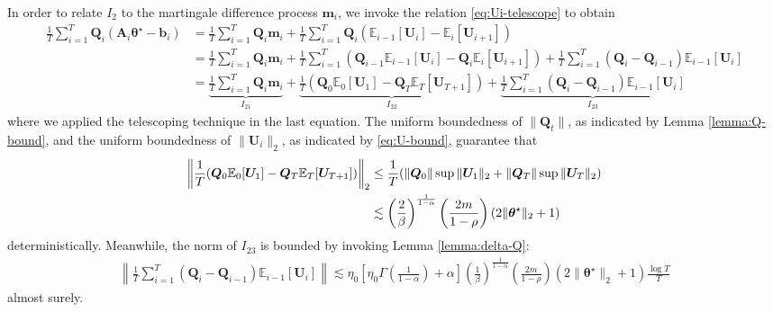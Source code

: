In order to relate $I_2$ to the martingale difference process $\bm{m}_i$, we invoke the  relation \eqref{eq:Ui-telescope} to obtain
\begin{align*}
\frac{1}{T}\sum_{i=1}^T \bm{Q}_i (\bm{A}_i \bm{\theta}^\star - \bm{b}_i)
&= \frac{1}{T}\sum_{i=1}^T \bm{Q}_i \bm{m}_i + \frac{1}{T}\sum_{i=1}^T \bm{Q}_i (\mathbb{E}_{i-1}[\bm{U}_i] - \mathbb{E}_i[\bm{U}_{i+1}]) \\ 
&= \frac{1}{T}\sum_{i=1}^T \bm{Q}_i \bm{m}_i + \frac{1}{T}\sum_{i=1}^T (\bm{Q}_{i-1}\mathbb{E}_{i-1}[\bm{U}_i] - \bm{Q}_{i}\mathbb{E}_i[\bm{U}_{i+1}]) + \frac{1}{T}\sum_{i=1}^T (\bm{Q}_i - \bm{Q}_{i-1})\mathbb{E}_{i-1}[\bm{U}_i] \\ 
&= \underset{I_{21}}{\underbrace{\frac{1}{T}\sum_{i=1}^T \bm{Q}_i \bm{m}_i}} + \underset{I_{22}}{\underbrace{\frac{1}{T}(\bm{Q}_0 \mathbb{E}_0[\bm{U}_1] - \bm{Q}_T \mathbb{E}_T [\bm{U}_{T+1}])}}+ \underset{I_{23}}{\underbrace{\frac{1}{T}\sum_{i=1}^T (\bm{Q}_i - \bm{Q}_{i-1})\mathbb{E}_{i-1}[\bm{U}_i]}}
\end{align*}
where we applied the telescoping technique in the last equation. The uniform boundedness of $\|\bm{Q}_t\|$, as indicated by Lemma \ref{lemma:Q-bound}, and the uniform boundedness of $\|\bm{U}_i\|_2$, as indicated by \eqref{eq:U-bound}, guarantee that
\begin{align}
\label{eq:markov-bar-deltat-I22-bound}
\left\|\frac{1}{T}(\bm{Q}_0 \mathbb{E}_0[\bm{U}_1] - \bm{Q}_T \mathbb{E}_T [\bm{U}_{T+1}])\right\|_2  
&\leq \frac{1}{T} (\|\bm{Q}_0\| \sup \|\bm{U}_1\|_2 + \|\bm{Q}_T\| \sup \|\bm{U}_T\|_2)\notag\\ 
&\lesssim  \left(\frac{2}{\beta}\right)^{\frac{1}{1-\alpha}}\left(\frac{2m}{1-\rho}\right)(2\|\bm{\theta}^\star\|_2+1)
\end{align}
deterministically.
Meanwhile, the norm of $I_{23}$ is bounded by invoking Lemma \ref{lemma:delta-Q}:
\begin{align}
\label{eq:markov-bar-deltat-I23-bound}
\left\|\frac{1}{T}\sum_{i=1}^T (\bm{Q}_i - \bm{Q}_{i-1})\mathbb{E}_{i-1}[\bm{U}_i]\right\| \lesssim \eta_0 \left[\eta_0 \Gamma\left(\frac{1}{1-\alpha}\right)+\alpha\right]\left(\frac{1}{\beta}\right)^{\frac{1}{1-\alpha}} \left(\frac{2m}{1-\rho}\right)(2\|\bm{\theta}^\star\|_2+1)\frac{\log T}{T}
\end{align}
almost surely. 

